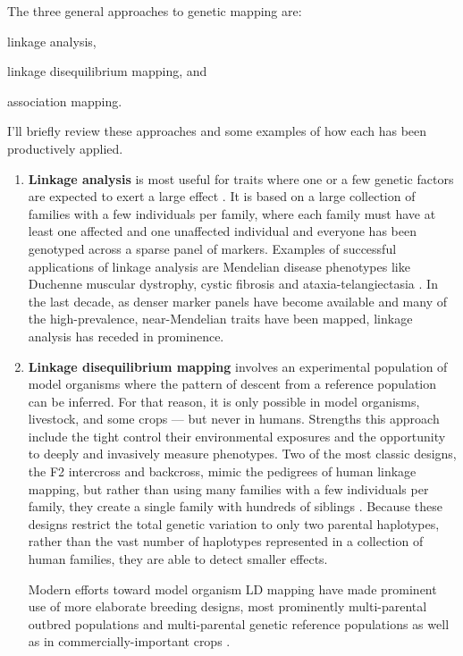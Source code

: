 The three general approaches to genetic mapping are:
\begin{enumerate*}
	\item linkage analysis, 
	\item linkage disequilibrium mapping, and
	\item association mapping.
\end{enumerate*}
I'll briefly review these approaches and some examples of how each has been productively applied.
\begin{enumerate}
	\item \textbf{Linkage analysis} is most useful for traits where one or a few genetic factors are expected to exert a large effect \citep{Elston1971,Haseman1972}.
	It is based on a large collection of families with a few individuals per family, where each family must have at least one affected and one unaffected individual and everyone has been genotyped across a sparse panel of markers.
	Examples of successful applications of linkage analysis are Mendelian disease phenotypes like Duchenne muscular dystrophy, \citep{Brown1985,Murray1982} cystic fibrosis \citep{Tsui1985,Wainwright1985,White1985} and ataxia-telangiectasia \citep{Gatti1988}.
	In the last decade, as denser marker panels have become available and many of the high-prevalence, near-Mendelian traits have been mapped, linkage analysis has receded in prominence.
	
	\item \textbf{Linkage disequilibrium mapping} involves an experimental population of model organisms where the pattern of descent from a reference population can be inferred.
	For that reason, it is only possible in model organisms, livestock, and some crops --- but never in humans.
	Strengths this approach include the tight control their environmental exposures and the opportunity to deeply and invasively measure phenotypes.
	Two of the most classic designs, the F2 intercross and backcross, mimic the pedigrees of human linkage mapping, but rather than using many families with a few individuals per family, they create a single family with hundreds of siblings \citep{Lynch1998,Lander1987,Lander1989a}.
	Because these designs restrict the total genetic variation to only two parental haplotypes, rather than the vast number of haplotypes represented in a collection of human families, they are able to detect smaller effects.

	Modern efforts toward model organism LD mapping have made prominent use of more elaborate breeding designs, most prominently multi-parental outbred populations \citep{Ghazalpour2012b,Svenson2012a} and multi-parental genetic reference populations \citep{TheComplexTraitConsortium2004,MacKay2012,King2012} as well as in commercially-important crops \citep{McMullen2009,Bandillo2013}.



\end{enumerate}
